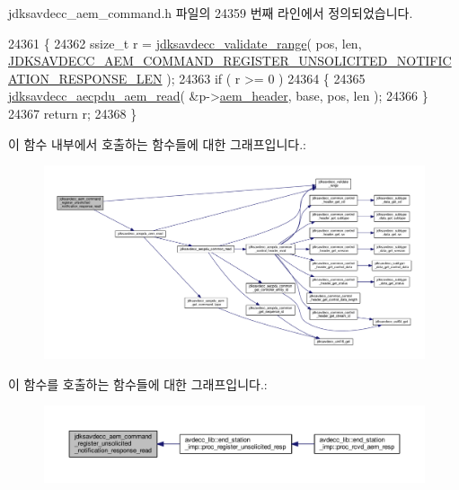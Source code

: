 jdksavdecc\+\_\+aem\+\_\+command.\+h 파일의 24359 번째 라인에서 정의되었습니다.


\begin{DoxyCode}
24361 \{
24362     ssize\_t r = \hyperlink{group__util_ga9c02bdfe76c69163647c3196db7a73a1}{jdksavdecc\_validate\_range}( pos, len, 
      \hyperlink{group__command__register__unsolicited__notification__response_ga25450d50a8a3a6d8a0094181bd597ec9}{JDKSAVDECC\_AEM\_COMMAND\_REGISTER\_UNSOLICITED\_NOTIFICATION\_RESPONSE\_LEN}
       );
24363     \textcolor{keywordflow}{if} ( r >= 0 )
24364     \{
24365         \hyperlink{group__aecpdu__aem_gae2421015dcdce745b4f03832e12b4fb6}{jdksavdecc\_aecpdu\_aem\_read}( &p->\hyperlink{structjdksavdecc__aem__command__register__unsolicited__notification__response_ae1e77ccb75ff5021ad923221eab38294}{aem\_header}, base, pos, len );
24366     \}
24367     \textcolor{keywordflow}{return} r;
24368 \}
\end{DoxyCode}


이 함수 내부에서 호출하는 함수들에 대한 그래프입니다.\+:
\nopagebreak
\begin{figure}[H]
\begin{center}
\leavevmode
\includegraphics[width=350pt]{group__command__register__unsolicited__notification__response_gad5b65676e63204bcbc249135a0d1d9be_cgraph}
\end{center}
\end{figure}




이 함수를 호출하는 함수들에 대한 그래프입니다.\+:
\nopagebreak
\begin{figure}[H]
\begin{center}
\leavevmode
\includegraphics[width=350pt]{group__command__register__unsolicited__notification__response_gad5b65676e63204bcbc249135a0d1d9be_icgraph}
\end{center}
\end{figure}


